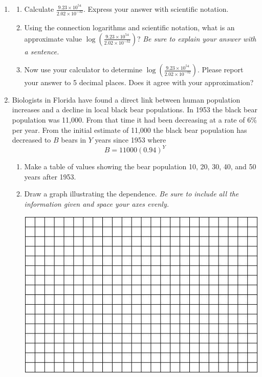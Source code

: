 \documentclass[12pt]{article}
\begin{document}
\newpage
\begin{enumerate}


\item \begin{enumerate}
\item Calculate $\displaystyle \frac{9.23 \times 10^{54}}{2.02 \times 10^{-32}} $.  Express your answer with scientific notation.
\vfill
\item Using the connection logarithms and scientific notation, what is an approximate value $\displaystyle \log \left( \frac{9.23 \times 10^{54}}{2.02 \times 10^{-32}} \right)$?  \emph{Be sure to explain your answer with a sentence.}
\vfill
\item Now use your calculator to determine  $\displaystyle \log \left(\frac{9.23 \times 10^{54}}{2.02 \times 10^{-32}}  \right)$. Please report your answer to 5 decimal places.  Does it agree with your approximation?
\vfill
\end{enumerate}

\newpage

\item Biologists in Florida have found a direct link between human population increases and a decline in local black bear populations.  In 1953 the black bear population was 11,000.  From that time it had been decreasing at a rate of 6\% per year.  From the initial estimate of 11,000 the black bear population has decreased to $B$ bears in $Y$ years since 1953 where $$B=11000(0.94)^Y$$

\begin{enumerate}
\item Make a table of values showing the bear population 10, 20, 30, 40, and 50 years after 1953.  
\vfill
\item Draw a graph illustrating the dependence.  \emph{Be sure to include all the information given and space your axes evenly.}

\vspace{.1in}
\begin{center}
 {\includegraphics [width = 6in] {../GraphPaper}}
\end{center}
\vspace{.1in}


\end{enumerate}
\end{enumerate}
\end{document}
